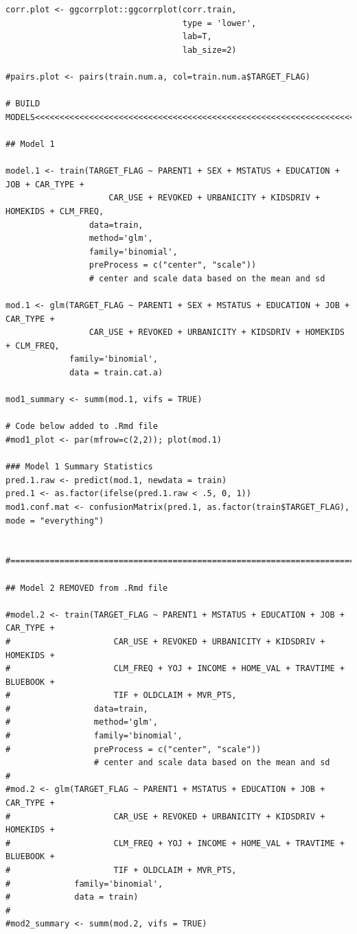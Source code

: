 \documentclass[]{article}
\begin{document}
\begin{verbatim}
corr.plot <- ggcorrplot::ggcorrplot(corr.train,
                                    type = 'lower',
                                    lab=T,
                                    lab_size=2)

#pairs.plot <- pairs(train.num.a, col=train.num.a$TARGET_FLAG)

# BUILD MODELS<<<<<<<<<<<<<<<<<<<<<<<<<<<<<<<<<<<<<<<<<<<<<<<<<<<<<<<<<<<<<<<<<<

## Model 1

model.1 <- train(TARGET_FLAG ~ PARENT1 + SEX + MSTATUS + EDUCATION + JOB + CAR_TYPE + 
                     CAR_USE + REVOKED + URBANICITY + KIDSDRIV + HOMEKIDS + CLM_FREQ,
                 data=train,
                 method='glm',
                 family='binomial',
                 preProcess = c("center", "scale")) 
                 # center and scale data based on the mean and sd

mod.1 <- glm(TARGET_FLAG ~ PARENT1 + SEX + MSTATUS + EDUCATION + JOB + CAR_TYPE + 
                 CAR_USE + REVOKED + URBANICITY + KIDSDRIV + HOMEKIDS + CLM_FREQ,
             family='binomial',
             data = train.cat.a)

mod1_summary <- summ(mod.1, vifs = TRUE)

# Code below added to .Rmd file
#mod1_plot <- par(mfrow=c(2,2)); plot(mod.1)

### Model 1 Summary Statistics
pred.1.raw <- predict(mod.1, newdata = train)
pred.1 <- as.factor(ifelse(pred.1.raw < .5, 0, 1))
mod1.conf.mat <- confusionMatrix(pred.1, as.factor(train$TARGET_FLAG), mode = "everything")


#==============================================================================#

## Model 2 REMOVED from .Rmd file

#model.2 <- train(TARGET_FLAG ~ PARENT1 + MSTATUS + EDUCATION + JOB + CAR_TYPE + 
#                     CAR_USE + REVOKED + URBANICITY + KIDSDRIV + HOMEKIDS + 
#                     CLM_FREQ + YOJ + INCOME + HOME_VAL + TRAVTIME + BLUEBOOK + 
#                     TIF + OLDCLAIM + MVR_PTS,
#                 data=train,
#                 method='glm',
#                 family='binomial',
#                 preProcess = c("center", "scale")) 
                  # center and scale data based on the mean and sd
#
#mod.2 <- glm(TARGET_FLAG ~ PARENT1 + MSTATUS + EDUCATION + JOB + CAR_TYPE + 
#                     CAR_USE + REVOKED + URBANICITY + KIDSDRIV + HOMEKIDS + 
#                     CLM_FREQ + YOJ + INCOME + HOME_VAL + TRAVTIME + BLUEBOOK + 
#                     TIF + OLDCLAIM + MVR_PTS,
#             family='binomial',
#             data = train)
#
#mod2_summary <- summ(mod.2, vifs = TRUE)


\end{verbatim}
\end{document}

